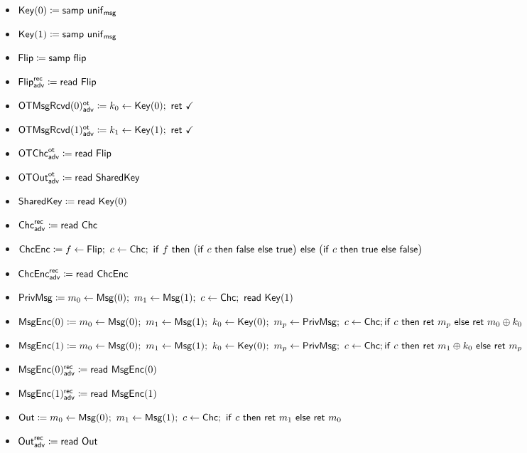 \begin{itemize}
\item $\mathsf{Key}(0) \coloneqq \mathsf{samp} \ \mathsf{unif}_{\mathsf{msg}}$
\item {\color{red} $\mathsf{Key}(1) \coloneqq \mathsf{samp} \ \mathsf{unif}_{\mathsf{msg}}$}
\item $\mathsf{Flip} \coloneqq \mathsf{samp} \ \mathsf{flip}$
\item {\color{blue} $\mathsf{Flip}^{\mathsf{rec}}_{\mathsf{adv}} \coloneqq \mathsf{read} \ \mathsf{Flip}$}
\item {\color{blue} $\LeakOTMsgRcvd(0)^\ot_\adv \coloneqq k_0 \leftarrow \Key(0); \ \ret{\checkmark}$}
\item {\color{blue} $\LeakOTMsgRcvd(1)^\ot_\adv \coloneqq k_1 \leftarrow \Key(1); \ \ret{\checkmark}$}
\item {\color{blue} $\mathsf{OTChc}^{\mathsf{ot}}_{\mathsf{adv}} \coloneqq \mathsf{read} \ \mathsf{Flip}$}
\item {\color{blue} $\mathsf{OTOut}^{\mathsf{ot}}_{\mathsf{adv}} \coloneqq \mathsf{read} \ \mathsf{SharedKey}$}
\item $\mathsf{SharedKey} \coloneqq \mathsf{read} \ \mathsf{Key}(0)$
\item {\color{blue} $\mathsf{Chc}^{\mathsf{rec}}_{\mathsf{adv}} \coloneqq \mathsf{read} \ \mathsf{Chc}$}
\item $\ChcEnc \coloneqq f \leftarrow \Flip; \ c \leftarrow \Chc; \ \ifte{f}{\big(\ifte{c}{\false}{\true}\big)}{\big(\ifte{c}{\true}{\false}\big)}$
\item {\color{blue} $\mathsf{ChcEnc}^{\mathsf{rec}}_{\mathsf{adv}} \coloneqq \mathsf{read} \ \mathsf{ChcEnc}$}
\item {\color{red} $\PrivMsg \coloneqq m_0 \leftarrow \Msg(0); \ m_1 \leftarrow \Msg(1); \ c \leftarrow \Chc; \ \read{\Key(1)}$}
\item $\mathsf{MsgEnc}(0) \coloneqq m_0 \leftarrow \mathsf{Msg}(0); \ m_1 \leftarrow \mathsf{Msg}(1); \ k_0 \leftarrow \mathsf{Key}(0); \ m_p \leftarrow \mathsf{PrivMsg}; \ c \leftarrow \mathsf{Chc}; \\ \mathsf{if} \ c \ \mathsf{then} \ \mathsf{ret} \ m_p \ \mathsf{else} \ \mathsf{ret} \ m_0 \oplus k_0$
\item $\mathsf{MsgEnc}(1) \coloneqq m_0 \leftarrow \mathsf{Msg}(0); \ m_1 \leftarrow \mathsf{Msg}(1); \ k_0 \leftarrow \mathsf{Key}(0); \ m_p \leftarrow \mathsf{PrivMsg}; \ c \leftarrow \mathsf{Chc}; \\ \mathsf{if} \ c \ \mathsf{then} \ \mathsf{ret} \ m_1 \oplus k_0 \ \mathsf{else} \ \mathsf{ret} \ m_p$
\item {\color{blue} $\mathsf{MsgEnc}(0)^{\mathsf{rec}}_{\mathsf{adv}} \coloneqq \mathsf{read} \ \mathsf{MsgEnc}(0)$}
\item {\color{blue} $\mathsf{MsgEnc}(1)^{\mathsf{rec}}_{\mathsf{adv}} \coloneqq \mathsf{read} \ \mathsf{MsgEnc}(1)$}
\item $\Out \coloneqq m_0 \leftarrow \Msg(0); \ m_1 \leftarrow \Msg(1); \ c \leftarrow \Chc; \ \ifte{c}{\ret{m_1}}{\ret{m_0}}$
\item {\color{blue} $\mathsf{Out}^{\mathsf{rec}}_{\mathsf{adv}} \coloneqq \mathsf{read} \ \mathsf{Out}$}
\end{itemize}

